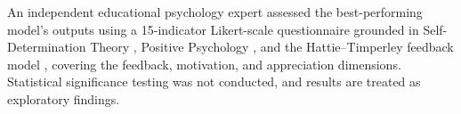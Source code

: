 \documentclass[conference,a4paper]{IEEEtran}
\begin{document}
An independent educational psychology expert
assessed the best-performing model's outputs using
a 15-indicator Likert-scale questionnaire grounded
in Self-Determination Theory
\cite{DeciRyan1985IntrinsicMotivation}, Positive
Psychology \cite{Fredrickson2001BroadenBuild}, and
the Hattie--Timperley feedback model
\cite{HattieTimperley2007PowerOfFeedback}, covering
the feedback, motivation, and appreciation dimensions.
Statistical significance testing was not conducted,
and results are treated as exploratory findings.



\end{document}
